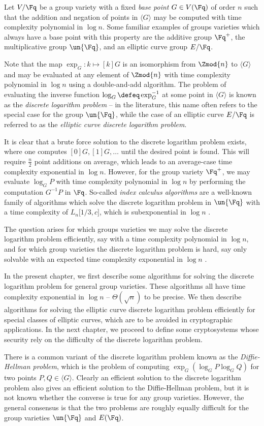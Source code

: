 Let $V / \Fq$ be a group variety with a fixed \emph{base point} $G \in V(\Fq)$ of order $n$ such that the addition and negation of points in $\langle G \rangle$ may be computed with time complexity polynomial in $\log n$. Some familiar examples of groups varieties which always have a base point with this property are the additive group $\Fq^+$, the multiplicative group $\un{\Fq}$, and an elliptic curve group $E / \Fq$.

Note that the map $\exp_G : k \mapsto [k] G$ is an isomorphism from $\Zmod{n}$ to $\langle G \rangle$ and may be evaluated at any element of $\Zmod{n}$ with time complexity polynomial in $\log n$ using a double-and-add algorithm. The problem of evaluating the inverse function $\log_G \defeq \exp_G^{-1}$ at some point in $\langle G \rangle$ is known as the \emph{discrete logarithm problem} -- in the literature, this name often refers to the special case for the group $\un{\Fq}$, while the case of an elliptic curve $E / \Fq$ is referred to as the \emph{elliptic curve discrete logarithm problem}.

It is clear that a brute force solution to the discrete logarithm problem exists, where one computes $[0] G, [1] G, \ldots$ until the desired point is found. This will require $\frac{n}{2}$ point additions on average, which leads to an average-case time complexity exponential in $\log n$. However, for the group variety $\Fq^+$, we may evaluate $\log_G P$ with time complexity polynomial in $\log n$ by performing the computation $G^{-1} P$ in $\Fq$. So-called \emph{index calculus algorithms} are a well-known family of algorithms which solve the discrete logarithm problem in $\un{\Fq}$ with a time complexity of $L_n \lbrack 1/3, c \rbrack$, which is subexponential in $\log n$ \citep{Galbraith}.

The question arises for which groups varieties we may solve the discrete logarithm problem efficiently, say with a time complexity polynomial in $\log n$, and for which group varieties the discrete logarithm problem is hard, say only solvable with an expected time complexity exponential in $\log n$ \citep{hyperelliptic}.

In the present chapter, we first describe some algorithms for solving the discrete logarithm problem for general group varieties. These algorithms all have time complexity exponential in $\log n$ -- $\Theta(\sqrt{n})$ to be precise. We then describe algorithms for solving the elliptic curve discrete logarithm problem efficiently for special classes of elliptic curves, which are to be avoided in cryptographic applications. In the next chapter, we proceed to define some cryptosystems whose security rely on the difficulty of the discrete logarithm problem.

There is a common variant of the discrete logarithm problem known as the \emph{Diffie-Hellman problem}, which is the problem of computing $\exp_G(\log_G P \log_G Q)$ for two points $P, Q \in \langle G \rangle$. Clearly an efficient solution to the discrete logarithm problem also gives an efficient solution to the Diffie-Hellman problem, but it is not known whether the converse is true for any group varieties. However, the general consensus is that the two problems are roughly equally difficult for the group varieties $\un{\Fq}$ and $E(\Fq)$.
